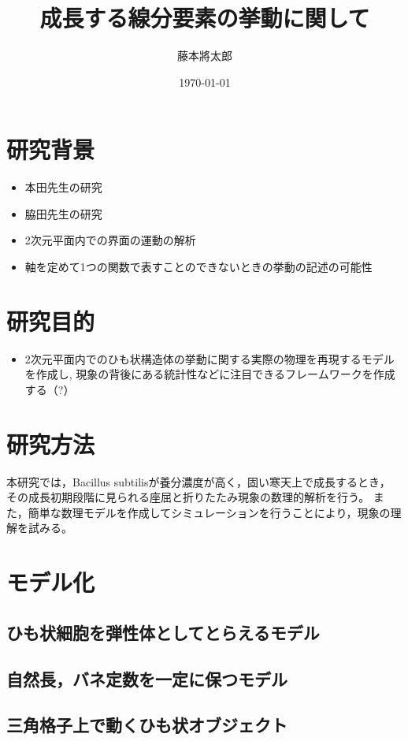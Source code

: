 \documentclass{jsarticle}
\title{成長する線分要素の挙動に関して}
\author{藤本將太郎}
\date{\today}
\theoremstyle{definition}
\begin{document}
\maketitle

\section{研究背景}\label{background}

\begin{itemize}
\itemsep1pt\parskip0pt
\item
  本田先生の研究
\item
  脇田先生の研究
\item
  2次元平面内での界面の運動の解析
\item
  軸を定めて1つの関数で表すことのできないときの挙動の記述の可能性
\end{itemize}

\section{研究目的}\label{purpose}

\begin{itemize}
\itemsep1pt\parskip0pt
\item
  2次元平面内でのひも状構造体の挙動に関する実際の物理を再現するモデルを作成し,
  現象の背後にある統計性などに注目できるフレームワークを作成する（?）
\end{itemize}

\section{研究方法}

本研究では，Bacillus subtilisが養分濃度が高く，固い寒天上で成長するとき，
その成長初期段階に見られる座屈と折りたたみ現象の数理的解析を行う。
また，簡単な数理モデルを作成してシミュレーションを行うことにより，現象の理解を試みる。

\section{モデル化}\label{about_model}

\subsection{ひも状細胞を弾性体としてとらえるモデル}


\subsection{自然長，バネ定数を一定に保つモデル}


\subsection{三角格子上で動くひも状オブジェクト}


% 
% 
\end{document}
